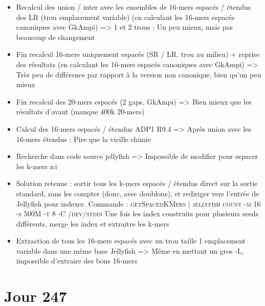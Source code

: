 \documentclass[12pt]{report}
\begin{document}
\begin{itemize}
	\item Recalcul des union / inter avec les ensembles de 16-mers espacés / étendus des LR (trou emplacement variable)
		  (en calculant les 16-mers espacés canoniques avec GkAmpi)
		  => 1 et 2 trous : Un peu mieux, mais pas beaucoup de changement 
		  
	\item Fin recalcul 16-mers uniquement espacés (SR / LR, trou au milieu) + reprise des résultats
		  (en calculant les 16-mers espacés canoniques avec GkAmpi)
		  => Très peu de différence par rapport à la version non canonique, bien qu'un peu mieux
		  
	\item Fin recalcul des 20-mers espacés (2 gaps, GkAmpi)
		  => Bien mieux que les résultats d'avant (manque 400k 20-mers)
	
	\item Calcul des 16-mers espacés / étendus ADP1 R9.4
		  => Après union avec les 16-mers étendus : Pire que la vieille chimie
	
	\item Recherche dans code source jellyfish => Impossible de modifier pour espacer les k-mers ici
	
	\item Solution retenue : sortir tous les k-mers espacés / étendus direct sur la sortie standard, sans les compter
		  (donc, avec doublons), et rediriger vers l'entrée de Jellyfish pour indexer.
		  Commande : \textsc{getSpacedKMers | jellyfish count -m 16 -s 500M -t 8 -C /dev/stdin}
		  Une fois les index construits pour plusieurs seeds différents, merge les index et extraitre
		  les k-mers
		  
	\item Extraction de tous les 16-mers espacés avec un trou taille 1 emplacement variable dans une même base Jellyfish
		  => Même en mettant un gros -L, impossible d'extraire des bons 16-mers 
\end{itemize}

\section{Jour 247}
\end{document}
